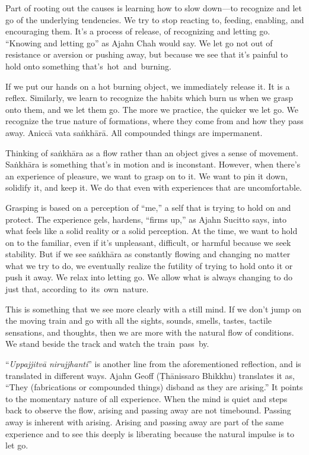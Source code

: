 Part of rooting out the causes is learning how to slow down---to recognize and let go of the underlying tendencies. We try to stop reacting to, feeding, enabling, and encouraging them. It's a process of release, of recognizing and letting go. ``Knowing and letting go'' as Ajahn Chah would say. We let go not out of resistance or aversion or pushing away, but because we see that it's painful to hold onto something \mbox{that's hot and burning.}

If we put our hands on a hot burning object, we immediately release it. It is a reflex. Similarly, we learn to recognize the habits which burn us when we grasp onto them, and we let them go. The more we practice, the quicker we let go. We recognize the true nature of formations, where they come from and how they pass away. Aniccā vata saṅkhārā. All compounded things are impermanent.

Thinking of saṅkhāra as a flow rather than an object gives a sense of movement. Saṅkhāra is something that's in motion and is inconstant. However, when there's an experience of pleasure, we want to grasp on to it. We want to pin it down, solidify it, and keep it. We do that even with experiences that are uncomfortable.

Grasping is based on a perception of ``me,'' a self that is trying to hold on and protect. The experience gels, hardens, ``firms up,'' as Ajahn Sucitto says, into what feels like a solid reality or a solid perception. At the time, we want to hold on to the familiar, even if it's unpleasant, difficult, or harmful because we seek stability. But if we see saṅkhāra as constantly flowing and changing no matter what we try to do, we eventually realize the futility of trying to hold onto it or push it away. We relax into letting go. We allow what is always changing to do just that, according \mbox{to its own nature.}

This is something that we see more clearly with a still mind. If we don't jump on the moving train and go with all the sights, sounds, smells, tastes, tactile sensations, and thoughts, then we are more with the natural flow of conditions. We stand beside the track and watch the \mbox{train pass by.}

``\emph{Uppajjitvā nirujjhanti}'' is another line from the aforementioned reflection, and is translated in different ways. Ajahn Geoff (Ṭhānissaro Bhikkhu) translates it as, ``They (fabrications or compounded things) disband as they are arising.'' It points to the momentary nature of all experience. When the mind is quiet and steps back to observe the flow, arising and passing away are not timebound. Passing away is inherent with arising. Arising and passing away are part of the same experience and to see this deeply is liberating because the natural impulse is to let go.

